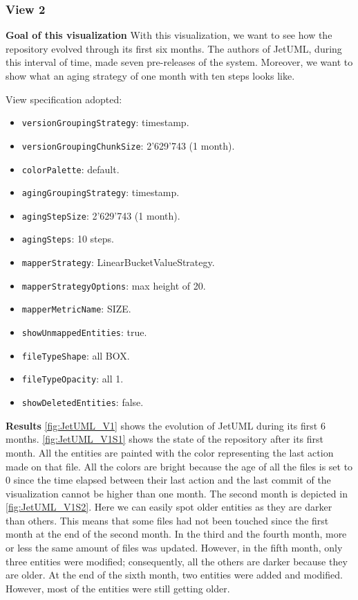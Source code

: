 \subsubsection{View 2}
\textbf{Goal of this visualization}
With this visualization, we want to see how the repository evolved through its first six months. 
The authors of JetUML, during this interval of time, made seven pre-releases of the system. 
Moreover, we want to show what an aging strategy of one month with ten steps looks like. 

\bigbreak
View specification adopted: 
\begin{itemize}
    \item \texttt{versionGroupingStrategy}: timestamp.
    \item \texttt{versionGroupingChunkSize}: 2'629'743 (1 month). 
    \item \texttt{colorPalette}: default.
    \item \texttt{agingGroupingStrategy}: timestamp.
    \item \texttt{agingStepSize}: 2'629'743 (1 month).
    \item \texttt{agingSteps}: 10 steps. 
    \item \texttt{mapperStrategy}: LinearBucketValueStrategy.
    \item \texttt{mapperStrategyOptions}: max height of 20.
    \item \texttt{mapperMetricName}: SIZE. 
    \item \texttt{showUnmappedEntities}: true.
    \item \texttt{fileTypeShape}: all BOX. 
    \item \texttt{fileTypeOpacity}: all 1. 
    \item \texttt{showDeletedEntities}: false.
\end{itemize}

\textbf{Results}
\autoref{fig:JetUML_V1} shows the evolution of JetUML during its first 6 months. \autoref{fig:JetUML_V1S1} shows the state of the repository after its first month. All the entities are painted with the color representing the last action made on that file. All the colors are bright because the age of all the files is set to 0 since the time elapsed between their last action and the last commit of the visualization cannot be higher than one month. The second month is depicted in \autoref{fig:JetUML_V1S2}. Here we can easily spot older entities as they are darker than others. This means that some files had not been touched since the first month at the end of the second month. In the third and the fourth month, more or less the same amount of files was updated. However, in the fifth month, only three entities were modified; consequently, all the others are darker because they are older. 
At the end of the sixth month, two entities were added and modified. However, most of the entities were still getting older. 

